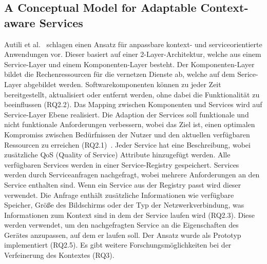 \documentclass[conference,compsoc,ngerman]{IEEEtran}
\begin{document}
\subsection{A Conceptual Model for Adaptable Context-aware Services}
Autili et al.~\cite{autili2006conceptual} schlagen einen Ansatz für anpassbare kontext- und serviceorientierte Anwendungen vor. Dieser basiert auf einer 2-Layer-Architektur, welche aus einem Service-Layer und einem Komponenten-Layer besteht. Der Komponenten-Layer bildet die Rechenressourcen für die vernetzen Dienste ab, welche auf dem Serice-Layer abgebildet werden. Softwarekomponenten können zu jeder Zeit bereitgestellt, aktualisiert oder entfernt werden, ohne dabei die Funktionalität zu beeinflussen (RQ2.2). Das Mapping zwischen Komponenten und Services wird auf Service-Layer Ebene realisiert.
Die Adaption der Services soll funktionale und nicht funktionale Anforderungen verbessern, wobei das Ziel ist, einen optimalen Kompromiss zwischen Bedürfnissen der Nutzer und den aktuellen verfügbaren Ressourcen zu erreichen (RQ2.1)~\cite{autili2006conceptual}. Jeder Service hat eine Beschreibung, wobei zusätzliche QoS (Quality of Service) Attribute hinzugefügt werden. Alle verfügbaren Services werden in einer Service-Registry gespeichert. Services werden durch Serviceanfragen nachgefragt, wobei mehrere Anforderungen an den Service enthalten sind. Wenn ein Service aus der Registry passt wird dieser verwendet. Die Anfrage enthält zusätzliche Informationen wie verfügbare Speicher, Größe des Bildschirms oder der Typ der Netzwerkverbindung, was Informationen zum Kontext sind in dem der Service laufen wird (RQ2.3). Diese werden verwendet, um den nachgefragten Service an die Eigenschaften des Gerätes anzupassen, auf dem er laufen soll.
Der Ansatz wurde als Prototyp implementiert (RQ2.5). Es gibt weitere Forschungsmöglichkeiten bei der Verfeinerung des Kontextes (RQ3).
\end{document}
